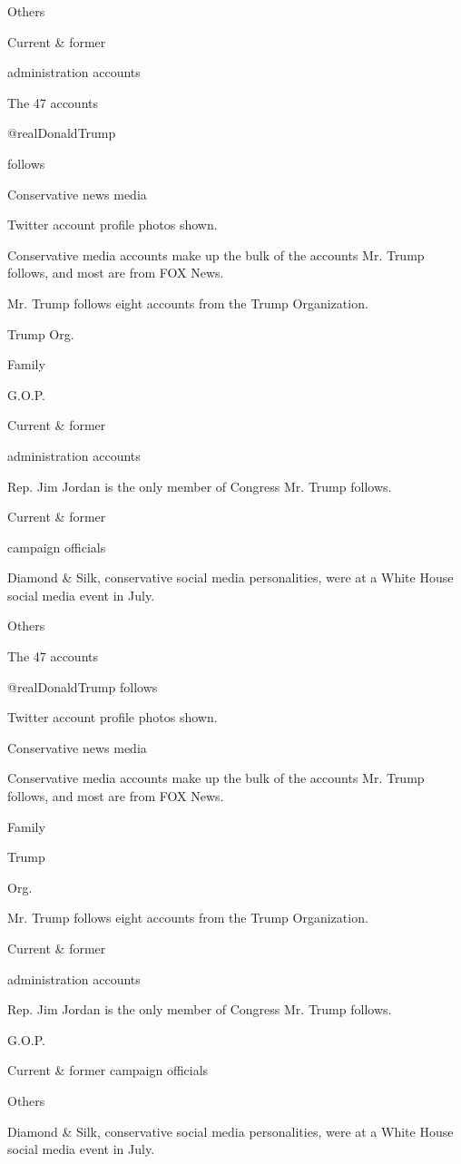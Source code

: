 Others

Current \& former

administration accounts

The 47 accounts

@realDonaldTrump

follows

Conservative news media

Twitter account profile photos shown.

Conservative media accounts make up the bulk of the accounts Mr. Trump
follows, and most are from FOX News.

Mr. Trump follows eight accounts from the Trump Organization.

Trump Org.

Family

G.O.P.

Current \& former

administration accounts

Rep. Jim Jordan is the only member of Congress Mr. Trump follows.

Current \& former

campaign officials

Diamond \& Silk, conservative social media personalities, were at a
White House social media event in July.

Others

The 47 accounts

@realDonaldTrump follows

Twitter account profile photos shown.

Conservative news media

Conservative media accounts make up the bulk of the accounts Mr. Trump
follows, and most are from FOX News.

Family

Trump

Org.

Mr. Trump follows eight accounts from the Trump Organization.

Current \& former

administration accounts

Rep. Jim Jordan is the only member of Congress Mr. Trump follows.

G.O.P.

Current \& former campaign officials

Others

Diamond \& Silk, conservative social media personalities, were at a
White House social media event in July.

